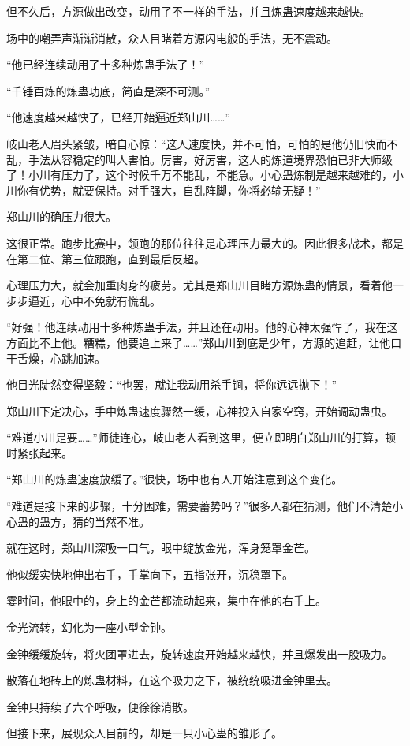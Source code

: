 \begin{this_body}
但不久后，方源做出改变，动用了不一样的手法，并且炼蛊速度越来越快。

场中的嘲弄声渐渐消散，众人目睹着方源闪电般的手法，无不震动。

“他已经连续动用了十多种炼蛊手法了！”

“千锤百炼的炼蛊功底，简直是深不可测。”

“他速度越来越快了，已经开始逼近郑山川……”

岐山老人眉头紧皱，暗自心惊：“这人速度快，并不可怕，可怕的是他仍旧快而不乱，手法从容稳定的叫人害怕。厉害，好厉害，这人的炼道境界恐怕已非大师级了！小川有压力了，这个时候千万不能乱，不能急。小心蛊炼制是越来越难的，小川你有优势，就要保持。对手强大，自乱阵脚，你将必输无疑！”

郑山川的确压力很大。

这很正常。跑步比赛中，领跑的那位往往是心理压力最大的。因此很多战术，都是在第二位、第三位跟跑，直到最后反超。

心理压力大，就会加重肉身的疲劳。尤其是郑山川目睹方源炼蛊的情景，看着他一步步逼近，心中不免就有慌乱。

“好强！他连续动用十多种炼蛊手法，并且还在动用。他的心神太强悍了，我在这方面比不上他。糟糕，他要追上来了……”郑山川到底是少年，方源的追赶，让他口干舌燥，心跳加速。

他目光陡然变得坚毅：“也罢，就让我动用杀手锏，将你远远抛下！”

郑山川下定决心，手中炼蛊速度骤然一缓，心神投入自家空窍，开始调动蛊虫。

“难道小川是要……”师徒连心，岐山老人看到这里，便立即明白郑山川的打算，顿时紧张起来。

“郑山川的炼蛊速度放缓了。”很快，场中也有人开始注意到这个变化。

“难道是接下来的步骤，十分困难，需要蓄势吗？”很多人都在猜测，他们不清楚小心蛊的蛊方，猜的当然不准。

就在这时，郑山川深吸一口气，眼中绽放金光，浑身笼罩金芒。

他似缓实快地伸出右手，手掌向下，五指张开，沉稳罩下。

霎时间，他眼中的，身上的金芒都流动起来，集中在他的右手上。

金光流转，幻化为一座小型金钟。

金钟缓缓旋转，将火团罩进去，旋转速度开始越来越快，并且爆发出一股吸力。

散落在地砖上的炼蛊材料，在这个吸力之下，被统统吸进金钟里去。

金钟只持续了六个呼吸，便徐徐消散。

但接下来，展现众人目前的，却是一只小心蛊的雏形了。


\end{this_body}
